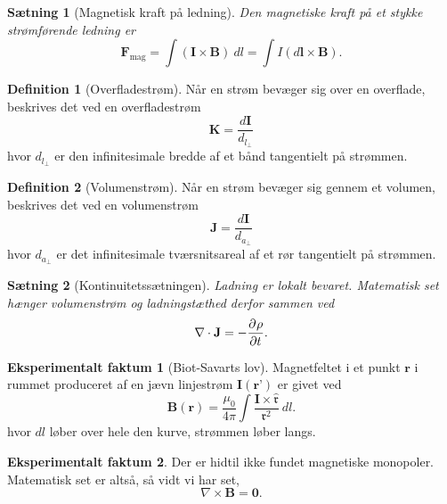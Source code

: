 \documentclass[]{article}
\newcommand{\fr}{\mathfrak{r}}
\newcommand{\hfr}{\hat{\mathfrak{r}}}
\newtheorem{theorem}{Sætning}
\theoremstyle{definition}
\newtheorem{definition}{Definition}
\newtheorem{experimental}{Eksperimentalt faktum}
\begin{document}
\begin{theorem}[Magnetisk kraft på ledning]
	Den magnetiske kraft på et stykke strømførende ledning er
	\begin{equation*}
		\mathbf{F}_\text{mag} = \int(\mathbf{I} \times \mathbf{B}) \ dl = \int I (d\mathbf{l} \times \mathbf{B}).
	\end{equation*}
\end{theorem}

\begin{definition}[Overfladestrøm]
	Når en strøm bevæger sig over en overflade, beskrives det ved en overfladestrøm
	\begin{equation*}
		\mathbf{K} = \dfrac{d\mathbf{I}}{d_{l_\perp}}
	\end{equation*}
	hvor $d_{l_\perp}$ er den infinitesimale bredde af et bånd tangentielt på strømmen.
\end{definition}

\begin{definition}[Volumenstrøm]
	Når en strøm bevæger sig gennem et volumen, beskrives det ved en volumenstrøm
	\begin{equation*}
		\mathbf{J} = \dfrac{d\mathbf{I}}{d_{a_\perp}}
	\end{equation*}
	hvor $d_{a_\perp}$ er det infinitesimale tværsnitsareal af et rør tangentielt på strømmen.
\end{definition}

\begin{theorem}[Kontinuitetssætningen]
	Ladning er lokalt bevaret. Matematisk set hænger volumenstrøm og ladningstæthed derfor sammen ved
	\begin{equation*}
		\nabla \cdot \mathbf{J} = -\frac{\partial^{} \rho}{\partial t ^{}}.
	\end{equation*}
\end{theorem}

\begin{experimental}[Biot-Savarts lov]
	Magnetfeltet i et punkt $\mathbf{r}$ i rummet produceret af en jævn linjestrøm $\mathbf{I}(\textbf{r'})$ er givet ved
	\begin{equation*}
		\mathbf{B}(\mathbf{r}) = \frac{\mu_0}{4 \pi} \int{\frac{\mathbf{I} \times \hfr}{\fr^2}} \ dl.
	\end{equation*}
	hvor $dl$ løber over hele den kurve, strømmen løber langs.
\end{experimental}

\begin{experimental}
	Der er hidtil ikke fundet magnetiske monopoler. Matematisk set er altså, så vidt vi har set,
	\begin{equation*}
		\nabla \times \mathbf{B} = \mathbf{0}.
	\end{equation*}
\end{experimental}
\end{document}
